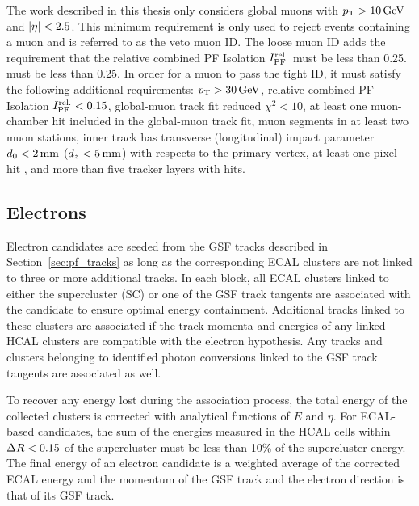 The work described in this thesis only considers global muons with $p_{\mathrm{T}} > 10\,\text{Ge\hspace{-.08em}V}$ and $\lvert \eta \rvert < 2.5$.
This minimum requirement is only used to reject events containing a muon and is referred to as the veto muon ID. 
The loose muon ID adds the requirement that the relative combined PF Isolation $I_{\text{PF}}^{\text{rel.}}$ must be less than 0.25.
 must be less than 0.25.
In order for a muon to pass the tight ID, it must satisfy the following additional requirements:
$p_{\mathrm{T}} > 30\,\text{Ge\hspace{-.08em}V}$,
relative combined PF Isolation $I_{\text{PF}}^{\text{rel.}} < 0.15$,
global-muon track fit reduced $\chi^2 < 10$,
at least one muon-chamber hit included in the global-muon track fit,
muon segments in at least two muon stations,
inner track has transverse (longitudinal) impact parameter $d_0 < 2\,\text{mm}$ ($d_z < 5\,\text{mm}$) with respects to the primary vertex,
at least one pixel hit ,
and more than five tracker layers with hits.

\subsection{Electrons}
\label{sec:pf_electrons}

Electron candidates are seeded from the GSF tracks described in Section~\ref{sec:pf_tracks} as long as the corresponding ECAL clusters are not linked to three or more additional tracks.
In each block, all ECAL clusters linked to either the supercluster (SC) or one of the GSF track tangents are associated with the candidate to ensure optimal energy containment.
Additional tracks linked to these clusters are associated if the track momenta and energies of any linked HCAL clusters are compatible with the electron hypothesis.
Any tracks and clusters belonging to identified photon conversions linked to the GSF track tangents are associated as well.  

To recover any energy lost during the association process, the total energy of the collected clusters is corrected with analytical functions of $E$ and $\eta$. 
For ECAL-based candidates, the sum of the energies measured in the HCAL cells within $\Delta R < 0.15$ of the supercluster must be less than 10\% of the supercluster energy.
The final energy of an electron candidate is a weighted average of the corrected ECAL energy and the momentum of the GSF track and the electron direction is that of its GSF track.

